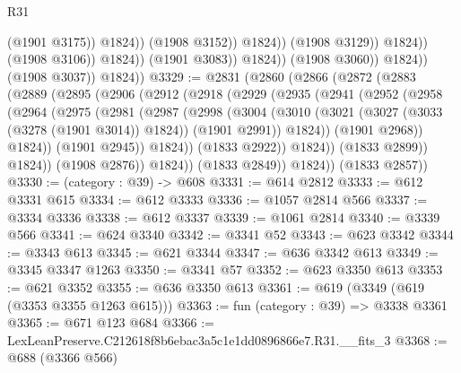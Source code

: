 \begin{lexlean}{R31}
\begin{coremodule}
                                              (@1901 @3175))
                                            @1824))
                                        (@1908 @3152))
                                      @1824))
                                  (@1908 @3129))
                                @1824))
                            (@1908 @3106))
                          @1824))
                      (@1901 @3083))
                    @1824))
                (@1908 @3060))
              @1824))
          (@1908 @3037))
        @1824))
@3329 := @2831
    (@2860
      (@2866
        (@2872
          (@2883
            (@2889
              (@2895
                (@2906
                  (@2912
                    (@2918
                      (@2929
                        (@2935
                          (@2941
                            (@2952
                              (@2958
                                (@2964
                                  (@2975
                                    (@2981
                                      (@2987
                                        (@2998
                                          (@3004
                                            (@3010
                                              (@3021
                                                (@3027 (@3033 (@3278 (@1901 @3014)) @1824))
                                                (@1901 @2991))
                                              @1824))
                                          (@1901 @2968))
                                        @1824))
                                    (@1901 @2945))
                                  @1824))
                              (@1833 @2922))
                            @1824))
                        (@1833 @2899))
                      @1824))
                  (@1908 @2876))
                @1824))
            (@1833 @2849))
          @1824))
      (@1833 @2857))
@3330 := (category : @39) -> @608
@3331 := @614 @2812
@3333 := @612 @3331 @615
@3334 := @612 @3333
@3336 := @1057 @2814 @566
@3337 := @3334 @3336
@3338 := @612 @3337
@3339 := @1061 @2814
@3340 := @3339 @566
@3341 := @624 @3340
@3342 := @3341 @52
@3343 := @623 @3342
@3344 := @3343 @613
@3345 := @621 @3344
@3347 := @636 @3342 @613
@3349 := @3345 @3347 @1263
@3350 := @3341 @57
@3352 := @623 @3350 @613
@3353 := @621 @3352
@3355 := @636 @3350 @613
@3361 := @619 (@3349 (@619 (@3353 @3355 @1263 @615)))
@3363 := fun (category : @39) => @3338 @3361
@3365 := @671 @123 @684
@3366 := LexLeanPreserve.C212618f8b6ebac3a5c1e1dd0896866e7.R31.__fits_3
@3368 := @688 (@3366 @566)

\end{coremodule}
\end{lexlean}
